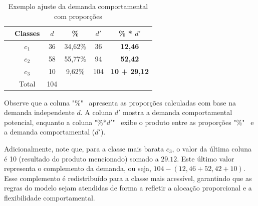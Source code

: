 \begin{table}[h!]
    \centering
    \begin{tabular}{lccccc}
        \toprule
        & Classes & $d$ & \% & $d'$ & \textbf{\% * $d'$} \\
        \midrule
              & $c_1$ & 36 & 34,62\% & 36 & \textbf{12,46} \\
              & $c_2$ & 58 & 55,77\% & 94 & \textbf{52,42} \\
              & $c_3$ & 10 & 9,62\% & 104 & \textbf{10 + 29,12} \\
        \midrule
              & Total & 104 & & & \\
        \bottomrule
    \end{tabular}
    \caption{Exemplo ajuste da demanda comportamental com proporções}
	\label{tab: exemplo_ajuste_demanda}
\end{table}

Observe que a coluna "\%" \, apresenta as proporções calculadas com base na demanda independente $d$. A coluna $d'$ mostra a demanda comportamental potencial, enquanto a coluna "\%*$d'$" \, exibe o produto entre as proporções "\%" \, e a demanda comportamental ($d'$).

Adicionalmente, note que, para a classe mais barata $c_3$, o valor da última coluna é 10 (resultado do produto mencionado) somado a $29.12$. Este último valor representa o complemento da demanda, ou seja, $104-(12,46+52,42+10)$. Esse complemento é redistribuído para a classe mais acessível, garantindo que as regras do modelo sejam atendidas de forma a refletir a alocação proporcional e a flexibilidade comportamental.

